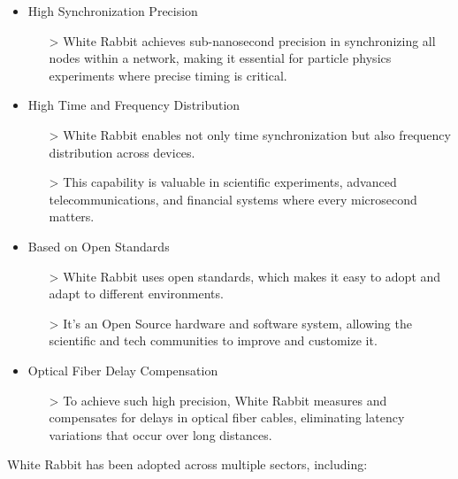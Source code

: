 \begin{itemize}
\item High Synchronization Precision
    \begin{itemize}
    \item[>] White Rabbit achieves sub-nanosecond precision in synchronizing all nodes within a network, making it essential for particle physics experiments where precise timing is critical.
    \end{itemize}
\item High Time and Frequency Distribution
    \begin{itemize}
    \item[>] White Rabbit enables not only time synchronization but also frequency distribution across devices.
    \item[>] This capability is valuable in scientific experiments, advanced telecommunications, and financial systems where every microsecond matters.
    \end{itemize}
\item Based on Open Standards
    \begin{itemize}
    \item[>] White Rabbit uses open standards, which makes it easy to adopt and adapt to different environments. 
    \item[>] It’s an Open Source hardware and software system, allowing the scientific and tech communities to improve and customize it.
    \end{itemize}
\item Optical Fiber Delay Compensation
    \begin{itemize}
    \item[>] To achieve such high precision, White Rabbit measures and compensates for delays in optical fiber cables, eliminating latency variations that occur over long distances.
    \end{itemize}
\end{itemize}

\vspace{5 mm}

\noindent White Rabbit has been adopted across multiple sectors, including:

